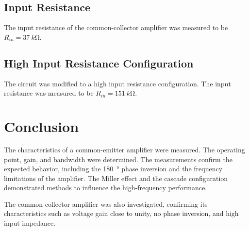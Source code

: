 \documentclass[12pt,a4paper]{article}
\begin{document}
\subsection{Input Resistance}
The input resistance of the common-collector amplifier was measured to be $R_{in} = \SI{37}{k\ohm}$.

\subsection{High Input Resistance Configuration}
The circuit was modified to a high input resistance configuration. The input resistance was measured to be $R_{in} = \SI{151}{k\ohm}$.

\section{Conclusion}
The characteristics of a common-emitter amplifier were measured. The operating point, gain, and bandwidth were determined. The measurements confirm the expected behavior, including the \SI{180}{\degree} phase inversion and the frequency limitations of the amplifier. The Miller effect and the cascade configuration demonstrated methods to influence the high-frequency performance.

The common-collector amplifier was also investigated, confirming its characteristics such as voltage gain close to unity, no phase inversion, and high input impedance.
\end{document}
